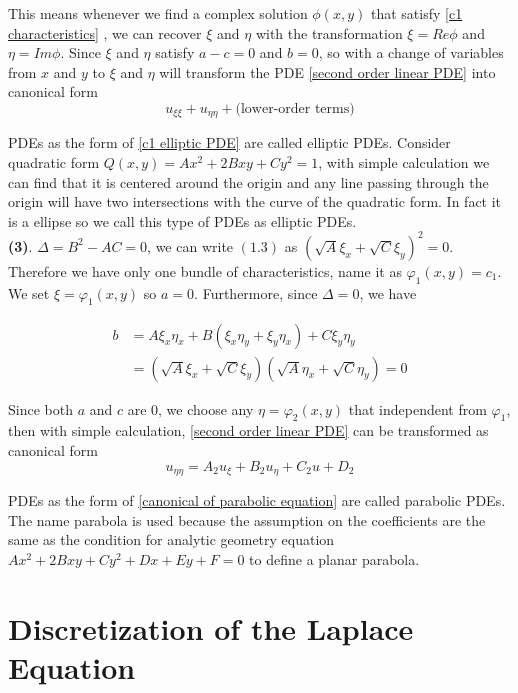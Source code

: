 	This means whenever we find a complex solution $\phi(x, y)$ that satisfy \eqref{c1 characteristics} , we can recover $\xi$ and $\eta$ with the transformation $\xi = Re\phi$ and $\eta = Im\phi$. Since $\xi$ and $\eta$ satisfy $a -c = 0$ and $b = 0$, so with a change of variables from $x$ and $y$ to $\xi$ and $\eta$ will transform the PDE \eqref{second order linear PDE} into canonical form 
	\begin{equation}
		u_{\xi\xi} + u_{\eta\eta} + \text{(lower-order terms)}
		\label{c1 elliptic PDE}
	\end{equation}
	
	PDEs as the form of \eqref{c1 elliptic PDE} are called elliptic PDEs. Consider quadratic form $Q(x, y) = Ax^2 + 2Bxy + Cy^2 = 1 $, with simple calculation we can find that it is centered around the origin and any line passing through the origin will have two intersections with the curve of the quadratic form. In fact it is a ellipse so we call this type of PDEs as elliptic PDEs.\\
	
	\textbf{(3)}. $\Delta = B^2 - AC = 0$, we can write $(1.3)$ as $(\sqrt{A}\xi_x + \sqrt{C}\xi_y)^2 = 0$. Therefore we have only one bundle of characteristics, name it as $\varphi_1(x, y) = c_1$. We set $\xi = \varphi_1(x, y)$ so $a = 0$. Furthermore, since $\Delta = 0$, we have 
	
	\begin{align*}
	b &= A\xi_x\eta_x + B(\xi_x\eta_y + \xi_y\eta_x) + C\xi_y\eta_y\\
	&= (\sqrt{A}\xi_x + \sqrt{C}\xi_y)(\sqrt{A}\eta_x + \sqrt{C}\eta_y) = 0	
	\end{align*}

	Since both $a$ and $c$ are 0, we choose any $\eta = \varphi_2(x, y)$ that independent from $\varphi_1$, then with simple calculation, \eqref{second order linear PDE} can be transformed as canonical form
	\begin{equation}
		u_{\eta\eta} = A_2u_{\xi} + B_2u_{\eta} + C_2u + D_2
		\label{canonical of parabolic equation}
	\end{equation}
	
	PDEs as the form of \eqref{canonical of parabolic equation} are called parabolic PDEs. The name parabola is used because the assumption on the coefficients are the same as the condition for analytic geometry equation $Ax^2 + 2Bxy + Cy^2 + Dx + Ey + F = 0$ to define a planar parabola.
	
	\section{Discretization of the Laplace Equation}
	
